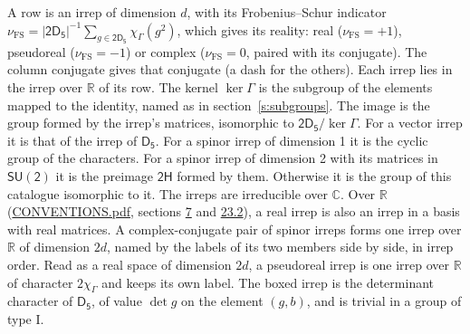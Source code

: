 \documentclass[10pt,a4paper]{article}
\numberwithin{equation}{section}
\newcommand{\grp}[1]{\mathsf{#1}}
\newcommand{\irchar}[1]{\chi_{#1}}
\newcommand{\fsind}{\nu_{\mathrm{FS}}}
\begin{document}
\leavevmode\label{n:index.frobenius}\label{n:head.irrep}\label{n:head.reality}A row is an irrep of dimension $d$, with its Frobenius--Schur indicator $\fsind = |\grp{2D_{5}}|^{-1}\allowbreak\sum_{g\in\grp{2D_{5}}}\irchar{\Gamma}(g^2)$, which gives its reality: real ($\fsind = +1$), pseudoreal ($\fsind = -1$) or complex ($\fsind = 0$, paired with its conjugate). \label{n:head.conjugate}The column conjugate gives that conjugate (a dash for the others). \label{n:head.over.real}Each irrep lies in the irrep over $\mathbb{R}$ of its row. \label{n:head.kernel}The kernel $\ker\Gamma$ is the subgroup of the elements mapped to the identity, named as in section~\ref{s:subgroups}. \label{n:head.image}The image is the group formed by the irrep's matrices, isomorphic to $\grp{2D_{5}}/\ker\Gamma$. For a vector irrep it is that of the irrep of \href{../../../rotation/data/pdf/D5.pdf}{$\grp{D_{5}}$}. For a spinor irrep of dimension 1 it is the cyclic group of the characters. For a spinor irrep of dimension 2 with its matrices in $\grp{SU(2)}$ it is the preimage $\grp{2H}$ formed by them. Otherwise it is the group of this catalogue isomorphic to it. The irreps are irreducible over $\mathbb{C}$. Over $\mathbb{R}$ (\href{../../CONVENTIONS.pdf}{CONVENTIONS.pdf}, sections \href{../../../rotation/CONVENTIONS.pdf\#conv.7}{7} and \href{../../CONVENTIONS.pdf\#conv.23.2}{23.2}), a real irrep is also an irrep in a basis with real matrices. A complex-conjugate pair of spinor irreps forms one irrep over $\mathbb{R}$ of dimension $2d$, named by the labels of its two members side by side, in irrep order. Read as a real space of dimension $2d$, a pseudoreal irrep is one irrep over $\mathbb{R}$ of character $2\irchar{\Gamma}$ and keeps its own label. \label{n:mark.determinant}The boxed irrep is the determinant character of \href{../../../rotation/data/pdf/D5.pdf}{$\grp{D_{5}}$}, of value $\det g$ on the element $(g, b)$, and is trivial in a group of type I.
\setlength{\emergencystretch}{2em}\par\setlength{\emergencystretch}{0pt}
\end{document}
